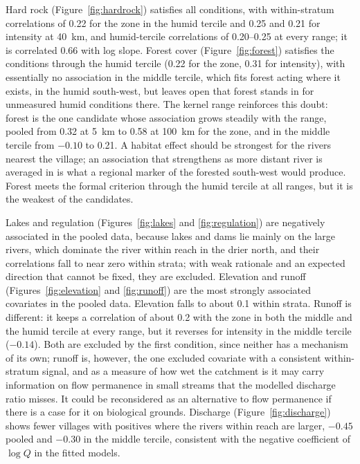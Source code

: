 \documentclass[11pt,a4paper]{article}
\begin{document}
Hard rock (Figure~\ref{fig:hardrock}) satisfies all conditions, with within-stratum correlations of 0.22 for the zone in the humid tercile and 0.25 and 0.21 for intensity at 40~km, and humid-tercile correlations of 0.20--0.25 at every range; it is correlated 0.66 with log slope. Forest cover (Figure~\ref{fig:forest}) satisfies the conditions through the humid tercile (0.22 for the zone, 0.31 for intensity), with essentially no association in the middle tercile, which fits forest acting where it exists, in the humid south-west, but leaves open that forest stands in for unmeasured humid conditions there. The kernel range reinforces this doubt: forest is the one candidate whose association grows steadily with the range, pooled from 0.32 at 5~km to 0.58 at 100~km for the zone, and in the middle tercile from $-0.10$ to 0.21. A habitat effect should be strongest for the rivers nearest the village; an association that strengthens as more distant river is averaged in is what a regional marker of the forested south-west would produce. Forest meets the formal criterion through the humid tercile at all ranges, but it is the weakest of the candidates.

Lakes and regulation (Figures~\ref{fig:lakes} and \ref{fig:regulation}) are negatively associated in the pooled data, because lakes and dams lie mainly on the large rivers, which dominate the river within reach in the drier north, and their correlations fall to near zero within strata; with weak rationale and an expected direction that cannot be fixed, they are excluded. Elevation and runoff (Figures~\ref{fig:elevation} and \ref{fig:runoff}) are the most strongly associated covariates in the pooled data. Elevation falls to about 0.1 within strata. Runoff is different: it keeps a correlation of about 0.2 with the zone in both the middle and the humid tercile at every range, but it reverses for intensity in the middle tercile ($-0.14$). Both are excluded by the first condition, since neither has a mechanism of its own; runoff is, however, the one excluded covariate with a consistent within-stratum signal, and as a measure of how wet the catchment is it may carry information on flow permanence in small streams that the modelled discharge ratio misses. It could be reconsidered as an alternative to flow permanence if there is a case for it on biological grounds. Discharge (Figure~\ref{fig:discharge}) shows fewer villages with positives where the rivers within reach are larger, $-0.45$ pooled and $-0.30$ in the middle tercile, consistent with the negative coefficient of $\log Q$ in the fitted models.
\end{document}
